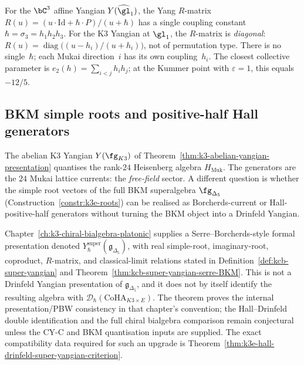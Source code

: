 \begin{remark}
\label{rem:k3-no-single-hbar}
For the $\bC^3$ affine Yangian $Y(\widehat{\gl}_1)$, the Yang
$R$-matrix $R(u) = (u \cdot \mathrm{Id} + \hbar \cdot P)/(u + \hbar)$
has a single coupling constant $\hbar = \sigma_3 = h_1 h_2 h_3$.
For the K3 Yangian at $\gl_1$, the $R$-matrix is
\emph{diagonal}:
$R(u) = \operatorname{diag}\bigl((u-h_i)/(u+h_i)\bigr)$,
not of permutation type. There is no single~$\hbar$; each
Mukai direction~$i$ has its own coupling~$h_i$. The closest
collective parameter is $e_2(h) = \sum_{i < j} h_i h_j$;
at the Kummer point with $\varepsilon = 1$, this equals $-12/5$.
\end{remark}




\subsection{BKM simple roots and positive-half Hall generators}
\label{subsec:k3-bkm-yangian-generators}

The abelian K3 Yangian $Y(\fg_{K3})$ of Theorem~\ref{thm:k3-abelian-yangian-presentation} quantises the rank-$24$ Heisenberg algebra $H_{\mathrm{Muk}}$. The generators are the $24$ Mukai lattice currents: the \emph{free-field} sector. A different question is whether the simple root vectors of the full BKM superalgebra $\fg_{\Delta_5}$ (Construction~\ref{constr:k3e-roots}) can be realised as Borcherds-current or Hall-positive-half generators without turning the BKM object into a Drinfeld Yangian.

\begin{remark}
\label{rem:k3yang-super-yangian-constructed}
Chapter~\ref{ch:k3-chiral-bialgebra-platonic} supplies a
Serre--Borcherds-style formal presentation denoted
\(Y_\hbar^{\mathrm{super}}(\mathfrak{g}_{\Delta_5})\), with real
simple-root, imaginary-root, coproduct, \(R\)-matrix, and classical-limit
relations stated in Definition~\ref{def:kcb-super-yangian} and
Theorem~\ref{thm:kcb-super-yangian-serre-BKM}. This is not a Drinfeld
Yangian presentation of \(\mathfrak{g}_{\Delta_5}\), and it does not by
itself identify the resulting algebra with
\(\mathcal D_{\hbar}(\mathrm{CoHA}_{K3\times E})\). The theorem proves
the internal presentation/PBW consistency in that chapter's convention;
the Hall--Drinfeld double identification and the full chiral bialgebra
comparison remain conjectural unless the CY-C and BKM quantisation inputs
are supplied. The exact compatibility data required for such an
upgrade is Theorem~\ref{thm:k3e-hall-drinfeld-super-yangian-criterion}.
\end{remark}

